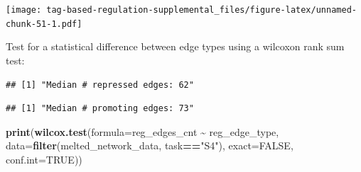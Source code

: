 \documentclass[
]{book}
\newenvironment{Shaded}{\begin{snugshade}}{\end{snugshade}}
\newcommand{\DataTypeTok}[1]{\textcolor[rgb]{0.13,0.29,0.53}{#1}}
\newcommand{\KeywordTok}[1]{\textcolor[rgb]{0.13,0.29,0.53}{\textbf{#1}}}
\newcommand{\NormalTok}[1]{#1}
\newcommand{\OperatorTok}[1]{\textcolor[rgb]{0.81,0.36,0.00}{\textbf{#1}}}
\newcommand{\OtherTok}[1]{\textcolor[rgb]{0.56,0.35,0.01}{#1}}
\newcommand{\StringTok}[1]{\textcolor[rgb]{0.31,0.60,0.02}{#1}}
\begin{document}
\texttt{[image: tag-based-regulation-supplemental\_files/figure-latex/unnamed-chunk-51-1.pdf]}

Test for a statistical difference between edge types using a wilcoxon rank sum test:

\begin{Shaded}
\end{Shaded}

\begin{verbatim}
## [1] "Median # repressed edges: 62"
\end{verbatim}

\begin{Shaded}
\end{Shaded}

\begin{verbatim}
## [1] "Median # promoting edges: 73"
\end{verbatim}

\begin{Shaded}
\begin{Highlighting}[]
\KeywordTok{print}\NormalTok{(}\KeywordTok{wilcox.test}\NormalTok{(}\DataTypeTok{formula=}\NormalTok{reg\_edges\_cnt }\OperatorTok{\textasciitilde{}}\StringTok{ }\NormalTok{reg\_edge\_type, }\DataTypeTok{data=}\KeywordTok{filter}\NormalTok{(melted\_network\_data, task}\OperatorTok{==}\StringTok{"S4"}\NormalTok{), }\DataTypeTok{exact=}\OtherTok{FALSE}\NormalTok{, }\DataTypeTok{conf.int=}\OtherTok{TRUE}\NormalTok{))}
\end{Highlighting}
\end{Shaded}
\end{document}

